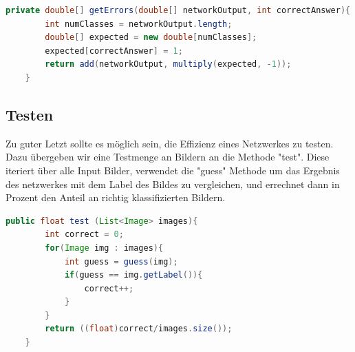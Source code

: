 \documentclass[12pt]{article}
\begin{document}
\begin{lstlisting}[language=Java]
private double[] getErrors(double[] networkOutput, int correctAnswer){
        int numClasses = networkOutput.length;
        double[] expected = new double[numClasses];
        expected[correctAnswer] = 1;
        return add(networkOutput, multiply(expected, -1));
    }
\end{lstlisting}

\subsection{Testen}

Zu guter Letzt sollte es möglich sein, die Effizienz eines Netzwerkes zu testen. Dazu übergeben wir eine Testmenge an Bildern an die Methode "test". Diese iteriert über alle Input Bilder, verwendet die "guess" Methode um das Ergebnis des netzwerkes mit dem Label des Bildes zu vergleichen, und errechnet dann in Prozent den Anteil an richtig klassifizierten Bildern.

\begin{lstlisting}[language=Java]
    public float test (List<Image> images){
        int correct = 0;
        for(Image img : images){
            int guess = guess(img);
            if(guess == img.getLabel()){
                correct++;
            }
        }
        return ((float)correct/images.size());
    }
 \end{lstlisting}
\end{document}
